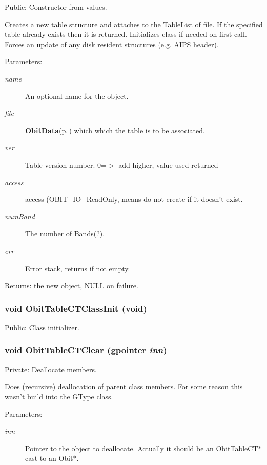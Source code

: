 Public: Constructor from values. 

Creates a new table structure and attaches to the Table\-List of file. If the specified table already exists then it is returned. Initializes class if needed on first call. Forces an update of any disk resident structures (e.g. AIPS header). \begin{Desc}
\item[Parameters:]
\begin{description}
\item[{\em name}]An optional name for the object. \item[{\em file}]{\bf Obit\-Data}{\rm (p.\,\pageref{structObitData})} which which the table is to be associated. \item[{\em ver}]Table version number. 0=$>$ add higher, value used returned \item[{\em access}]access (OBIT\_\-IO\_\-Read\-Only, means do not create if it doesn't exist. \item[{\em num\-Band}]The number of Bands(?). \item[{\em err}]Error stack, returns if not empty. \end{description}
\end{Desc}
\begin{Desc}
\item[Returns:]the new object, NULL on failure. \end{Desc}
\subsubsection{\setlength{\rightskip}{0pt plus 5cm}void Obit\-Table\-CTClass\-Init (void)}\label{ObitTableCT_8c_a27}


Public: Class initializer. 

\subsubsection{\setlength{\rightskip}{0pt plus 5cm}void Obit\-Table\-CTClear (gpointer {\em inn})}\label{ObitTableCT_8c_a9}


Private: Deallocate members. 

Does (recursive) deallocation of parent class members. For some reason this wasn't build into the GType class. \begin{Desc}
\item[Parameters:]
\begin{description}
\item[{\em inn}]Pointer to the object to deallocate. Actually it should be an Obit\-Table\-CT$\ast$ cast to an Obit$\ast$. \end{description}
\end{Desc}
